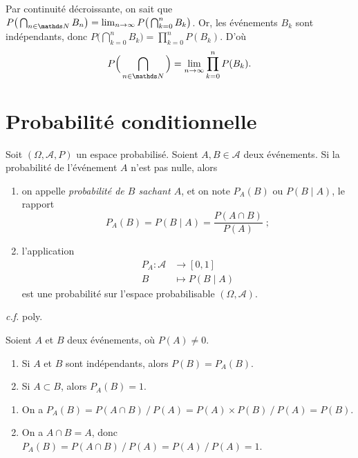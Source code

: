 \begin{prv}
	Par continuité décroissante, on sait que $P\big(\bigcap_{n \in \N} B_n\big) = \lim_{n \to \infty} P\big(\bigcap_{k=0}^n B_k\big)$. Or, les événements $B_k$\/ sont indépendants, donc $P\big(\bigcap_{k=0}^n B_k\big) = \prod_{k=0}^n P(B_k)$. D'où \[
		P\Big(\bigcap_{n \in \N} \Big) = \lim_{n\to \infty} \prod_{k=0}^n P(B_k)
	.\]
\end{prv}

\section{Probabilité conditionnelle}

\begin{prop-defn}
	Soit $(\Omega, \mathcal{A}, P)$\/ un espace probabilisé. Soient $A, B \in \mathcal{A}$\/ deux événements. Si la probabilité de l'événement $A$\/ n'est pas nulle, alors
	\begin{enumerate}
		\item on appelle \textit{probabilité de $B$\/ sachant $A$}, et on note $P_A(B)$\/ ou $P(B  \mid A)$, le rapport \[
				P_A(B) = P(B  \mid A) = \frac{P(A \cap B)}{P(A)}\;;
			\]
		\item l'application \begin{align*}
				P_A: \mathcal{A} &\longrightarrow [0,1] \\
				B &\longmapsto P(B  \mid A)
			\end{align*} est une probabilité sur l'espace probabilisable $(\Omega, \mathcal{A})$.
	\end{enumerate}
\end{prop-defn}

\begin{prv}
	\textit{c.f.} poly.
\end{prv}

\begin{prop}
	Soient $A$\/ et $B$\/ deux événements, où $P(A) \neq 0$.
	\begin{enumerate}
		\item Si $A$\/ et $B$\/ sont indépendants, alors $P(B) = P_A(B)$.
		\item Si $A \subset B$, alors $P_A(B) = 1$.
	\end{enumerate}
\end{prop}

\begin{prv}
	\begin{enumerate}
		\item On a $P_A(B) = P(A \cap B) \:/\: P(A) = P(A) \times P(B) \:/\: P(A) = P(B)$.
		\item On a $A \cap B = A$, donc $P_A(B) = P(A \cap B) \:/\: P(A) = P(A) \:/\: P(A) = 1$.
	\end{enumerate}
\end{prv}

